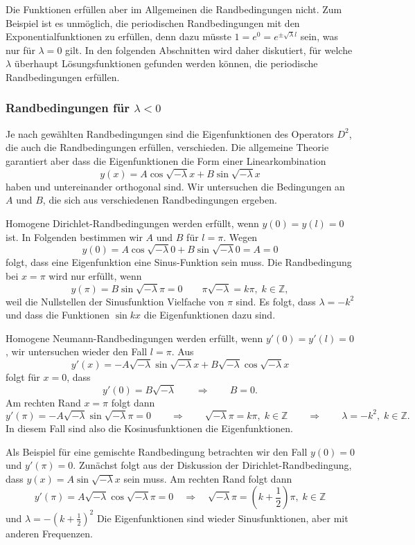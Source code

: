 Die Funktionen erfüllen aber im Allgemeinen die Randbedingungen nicht.
Zum Beispiel ist es unmöglich, die periodischen Randbedingungen
mit den Exponentialfunktionen zu erfüllen, denn dazu müsste
$1=e^{0}=e^{\pm\!\sqrt{\lambda}l}$ sein, was nur für $\lambda=0$
gilt.
In den folgenden Abschnitten wird daher diskutiert, für welche $\lambda$
überhaupt Lösungsfunktionen gefunden werden können, die periodische
Randbedingungen erfüllen.

%
%
\subsubsection{Randbedingungen für $\lambda<0$}
Je nach gewählten Randbedingungen sind die Eigenfunktionen des Operators
$D^2$, die auch die Randbedingungen erfüllen, verschieden.
Die allgemeine Theorie garantiert aber dass die Eigenfunktionen die
Form einer Linearkombination
\begin{equation}
y(x)
=
A\cos \!\sqrt{-\lambda}x
+
B\sin \!\sqrt{-\lambda}x
\label{buch:orthofkt:pde:periodisch}
\end{equation}
haben und untereinander orthogonal sind.
Wir untersuchen die Bedingungen an $A$ und $B$, die sich aus verschiedenen
Randbedingungen ergeben.

Homogene Dirichlet-Randbedingungen werden erfüllt, wenn $y(0)=y(l)=0$ ist.
In Folgenden bestimmen wir $A$ und $B$ für $l=\pi$.
Wegen
\[
y(0)
=
A\cos \!\sqrt{-\lambda}0
+
B\sin \!\sqrt{-\lambda}0
=
A
=
0
\]
folgt, dass eine Eigenfunktion eine Sinus-Funktion sein muss.
Die Randbedingung bei $x=\pi$ wird nur erfüllt, wenn
\[
y(\pi)
=
B\sin\!\sqrt{-\lambda}\pi
=
0
\qquad
\pi\!\sqrt{-\lambda}
=
k\pi,\; k\in\mathbb{Z},
\]
weil die Nullstellen der Sinusfunktion Vielfache von $\pi$ sind.
Es folgt, dass $\lambda = -k^2$ und dass die Funktionen $\sin kx$
die Eigenfunktionen dazu sind.

Homogene Neumann-Randbedingungen werden erfüllt, wenn $y'(0)=y'(l)=0$,
wir untersuchen wieder den Fall $l=\pi$.
Aus
\[
y'(x)
=
-A\!\sqrt{-\lambda}\sin\!\sqrt{-\lambda} x 
+
B\!\sqrt{-\lambda}\cos\!\sqrt{-\lambda} x 
\]
folgt für $x=0$, dass
\[
y'(0)
=
B\!\sqrt{-\lambda}
\qquad\Rightarrow\qquad B=0.
\]
Am rechten Rand $x=\pi$ folgt dann
\[
y'(\pi)
=
-A\!\sqrt{-\lambda}\sin\!\sqrt{-\lambda}\pi
=
0
\qquad\Rightarrow\qquad
\!\sqrt{-\lambda}\pi = k\pi,\; k\in\mathbb{Z}
\qquad\Rightarrow\qquad
\lambda=-k^2,\;k\in\mathbb{Z}.
\]
In diesem Fall sind also die Kosinusfunktionen die Eigenfunktionen.

Als Beispiel für eine gemischte Randbedingung betrachten wir den
Fall $y(0)=0$ und $y'(\pi)=0$.
Zunächst folgt aus der Diskussion der Dirichlet-Randbedingung, dass
$y(x)=A\sin\!\sqrt{-\lambda}x$ sein muss.
Am rechten Rand folgt dann
\[
y'(\pi)
=
A\!\sqrt{-\lambda}\cos\!\sqrt{-\lambda}\pi
=
0
\quad\Rightarrow\quad
\!\sqrt{-\lambda}\pi = (k+{\textstyle\frac12})\pi,\;k\in\mathbb{Z}
\]
und $\lambda = -(k+{\textstyle\frac12})^2$
Die Eigenfunktionen sind wieder Sinusfunktionen, aber mit anderen
Frequenzen.

